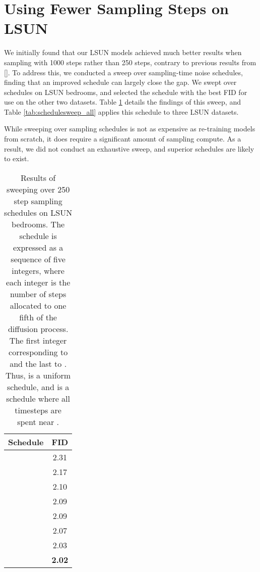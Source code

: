 \documentclass{article}
\newcommand{\namecite}[1]{\citeauthor{#1} [\citenum{#1}]}
\begin{document}
\clearpage
\section{Using Fewer Sampling Steps on LSUN}
\label{app:lsunsweep}

We initially found that our LSUN models achieved much better results when sampling with 1000 steps rather than 250 steps, contrary to previous results from \namecite{improved}. To address this, we conducted a sweep over sampling-time noise schedules, finding that an improved schedule can largely close the gap. We swept over schedules on LSUN bedrooms, and selected the schedule with the best FID for use on the other two datasets. Table \ref{tab:schedulesweep} details the findings of this sweep, and Table \ref{tab:schedulesweep_all} applies this schedule to three LSUN datasets.

While sweeping over sampling schedules is not as expensive as re-training models from scratch, it does require a significant amount of sampling compute. As a result, we did not conduct an exhaustive sweep, and superior schedules are likely to exist.

\begin{table}[h]
    \begin{center}
    \begin{small}
    \begin{tabular}{lc}
    \toprule
    Schedule & FID \\
    \midrule
     & 2.31 \\
     & 2.17 \\
     & 2.10 \\
     & 2.09 \\
     & 2.09 \\
     & 2.07 \\
     & 2.03 \\
     & \bf 2.02 \\
    \bottomrule
    \end{tabular}
    \end{small}
    \end{center}
    \caption{Results of sweeping over 250 step sampling schedules on LSUN bedrooms. The schedule is expressed as a sequence of five integers, where each integer is the number of steps allocated to one fifth of the diffusion process. The first integer corresponding to  and the last to . Thus,  is a uniform schedule, and  is a schedule where all timesteps are spent near .}
    \label{tab:schedulesweep}
\end{table}
\end{document}
